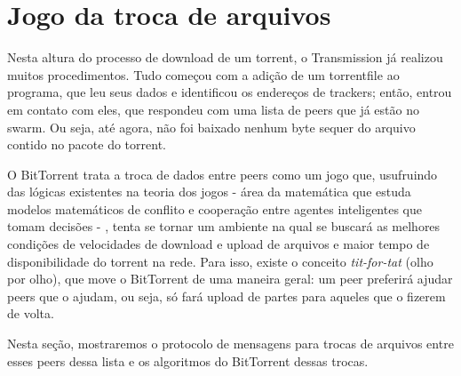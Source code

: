 
\newpage
\section{Jogo da troca de arquivos}
\label{sec:titfortat}

Nesta altura do processo de download de um \gls*{torrent}, o Transmission já realizou
muitos procedimentos. Tudo começou com a adição de um \gls*{torrentfile} ao programa,
que leu seus dados e identificou os endereços de \glspl*{tracker}; então, entrou em
contato com eles, que respondeu com uma lista de \glspl*{peer} que já estão no
\gls*{swarm}. Ou seja, até agora, não foi baixado nenhum byte sequer do arquivo contido
no pacote do \gls*{torrent}.

O BitTorrent trata a troca de dados entre \glspl*{peer} como um jogo que, usufruindo
das lógicas existentes na teoria dos jogos - área da matemática que estuda modelos
matemáticos de conflito e cooperação entre agentes inteligentes que tomam decisões -
, tenta se tornar um ambiente na qual se buscará as melhores condições de velocidades
de download e upload de arquivos e maior tempo de disponibilidade do \gls*{torrent} na
rede. Para isso, existe o conceito \emph{tit-for-tat} (olho por olho), que move o
BitTorrent de uma maneira geral: um \gls*{peer} preferirá ajudar \glspl*{peer} que o
ajudam, ou seja, só fará upload de partes para aqueles que o fizerem de volta.

Nesta seção, mostraremos o protocolo de mensagens para trocas de arquivos entre esses
\glspl*{peer} dessa lista e os algoritmos do BitTorrent dessas trocas.







